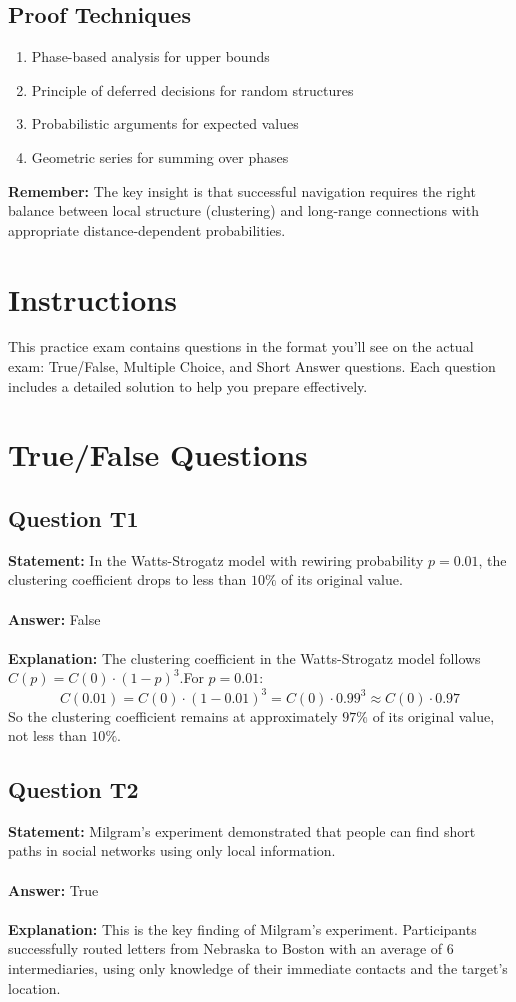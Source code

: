 \documentclass[11pt,a4paper]{article}
\theoremstyle{definition}
\begin{document}
\subsection{Proof Techniques}
\begin{enumerate}
\item Phase-based analysis for upper bounds
\item Principle of deferred decisions for random structures
\item Probabilistic arguments for expected values
\item Geometric series for summing over phases
\end{enumerate}
\textbf{Remember:} The key insight is that successful navigation requires the right balance between local structure (clustering) and long-range connections with appropriate distance-dependent probabilities.

\section*{Instructions}
This practice exam contains questions in the format you'll see on the actual exam: True/False, Multiple Choice, and Short Answer questions. Each question includes a detailed solution to help you prepare effectively.
\section{True/False Questions}
\subsection{Question T1}
\textbf{Statement:} In the Watts-Strogatz model with rewiring probability $p = 0.01$, the clustering coefficient drops to less than $10\%$ of its original value.\\
\\
\textbf{Answer:} False\\
\\
\textbf{Explanation:} The clustering coefficient in the Watts-Strogatz model follows $C(p) = C(0) \cdot (1-p)^3$.For $p = 0.01$:
$$
C(0.01) = C(0)\cdot (1-0.01)^3  = C(0)\cdot 0.99^3\approx C(0)\cdot 0.97
$$
So the clustering coefficient remains at approximately $97\%$ of its original value, not less than $10\%$.
\subsection{Question T2}
\textbf{Statement:} Milgram's experiment demonstrated that people can find short paths in social networks using only local information.\\
\\
\textbf{Answer:} True\\
\\
\textbf{Explanation:} This is the key finding of Milgram's experiment. Participants successfully routed letters from Nebraska to Boston with an average of 6 intermediaries, using only knowledge of their immediate contacts and the target's location.
\end{document}

